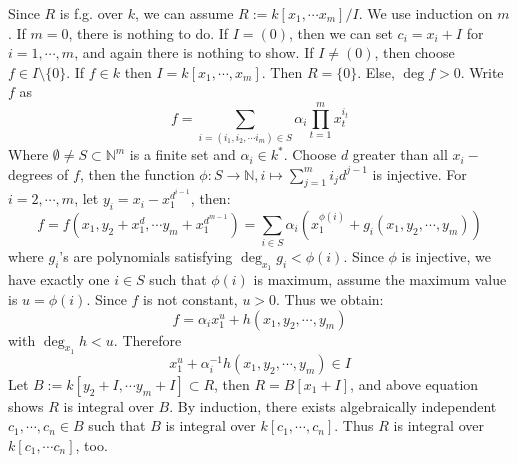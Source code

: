 \documentclass{ctexart}
\newcommand\<{\langle}
\renewcommand\>{\rangle}
\def\to{\rightarrow}
\begin{document}
\begin{solution}
  Since $R$ is f.g. over $k$, we can assume $R:=k[x_1,\cdots x_m]/I$.
  We use induction on $m$.
  If $m=0$, there is nothing to do. If $I=(0)$, then we can set $c_i=x_i+I$ for $i=1,\cdots ,m$, and again there is nothing to show.
  If $I\neq (0)$, then choose $f\in I\setminus\{0\}$.
  If $f\in k$ then $I=k[x_1,\cdots,x_m]$. Then $R=\{0\}$. Else, $\deg f>0$.
  Write $f$ as
  \begin{equation}
    f=\sum_{i=(i_1,i_2,\cdots i_m)\in S}\alpha_{i}\prod_{t=1}^{m}x_{t}^{i_t}
  \end{equation}
  Where $\emptyset \neq S\subset \mathbb{N}^m$ is a finite set and $\alpha_{i}\in k^*$. Choose $d$ greater than all $x_i-$degrees of $f$, then the function $\phi:S\to \mathbb{N},i\mapsto \sum_{j=1}^mi_jd^{j-1}$ is injective. For $i=2,\cdots,m$, let $y_i=x_i-x_1^{d^{i-1}}$, then:
  \begin{equation}
    f=f\left(x_1,y_2+x_1^d,\cdots y_m+x_1^{d^{m-1}}\right)=\sum_{i\in S} \alpha_i\left(x_1^{\phi(i)}+g_{i}(x_1,y_2,\cdots ,y_m)\right)
  \end{equation}
  where $g_{i}$'s are polynomials satisfying $\deg_{x_1}g_{i}<\phi(i)$. Since $\phi$ is injective, we have exactly one $i\in S$ such that $\phi(i)$ is maximum, assume the maximum value is $u=\phi(i)$. Since $f$ is not constant, $u>0$. Thus we obtain:
  \begin{equation}
    f=\alpha_{i}x_1^u + h(x_1,y_2,\cdots,y_m)
  \end{equation}
  with $\deg_{x_1} h<u$. Therefore
  \begin{equation}
    x_1^u+\alpha_{i}^{-1}h(x_1,y_2,\cdots,y_m)\in I
  \end{equation}
  Let $B:=k[y_2+I,\cdots y_m+I]\subset R$, then $R=B[x_1+I]$, and above equation shows $R$ is integral over $B$. By induction, there exists algebraically independent $c_1,\cdots,c_n\in B$ such that $B$ is integral over $k[c_1,\cdots,c_n]$. Thus $R$ is integral over $k[c_1,\cdots c_n]$, too.
\end{solution}
\end{document}
